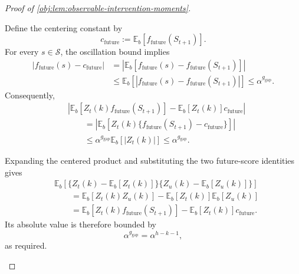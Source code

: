 \begin{proof}[Proof of \cref{obj:lem:observable-intervention-moments}]
\begin{enumerate}
Define the centering constant by
\[
c_{\mathrm{future}}
:=
\mathbb E_b[f_{\mathrm{future}}(S_{t+1})].
\]
For every \(s\in\mathcal S\), the oscillation bound implies
\[
\begin{aligned}
|f_{\mathrm{future}}(s)-c_{\mathrm{future}}|
&=
\left|\mathbb E_b[
f_{\mathrm{future}}(s)-f_{\mathrm{future}}(S_{t+1})]\right|\\
&\le
\mathbb E_b\!\left[
|f_{\mathrm{future}}(s)-f_{\mathrm{future}}(S_{t+1})|
\right]
\le\alpha^{g_{\mathrm{gap}}}.
\end{aligned}
\]
Consequently,
\[
\begin{aligned}
&\left|
\mathbb E_b[Z_t(k)f_{\mathrm{future}}(S_{t+1})]
-\mathbb E_b[Z_t(k)]c_{\mathrm{future}}
\right|\\
&\qquad=
\left|\mathbb E_b\!\left[
Z_t(k)\{f_{\mathrm{future}}(S_{t+1})-c_{\mathrm{future}}\}
\right]\right|\\
&\qquad\le
\alpha^{g_{\mathrm{gap}}}\mathbb E_b[|Z_t(k)|]
\le\alpha^{g_{\mathrm{gap}}}.
\end{aligned}
\]

Expanding the centered product and substituting the two future-score identities gives
\[
\begin{aligned}
&\mathbb E_b\!\left[
\{Z_t(k)-\mathbb E_b[Z_t(k)]\}
\{Z_u(k)-\mathbb E_b[Z_u(k)]\}
\right]\\
&\qquad=
\mathbb E_b[Z_t(k)Z_u(k)]
-\mathbb E_b[Z_t(k)]\mathbb E_b[Z_u(k)]\\
&\qquad=
\mathbb E_b[Z_t(k)f_{\mathrm{future}}(S_{t+1})]
-\mathbb E_b[Z_t(k)]c_{\mathrm{future}}.
\end{aligned}
\]
Its absolute value is therefore bounded by
\[
\alpha^{g_{\mathrm{gap}}}=\alpha^{h-k-1},
\]
as required.
\end{enumerate}
\end{proof}
